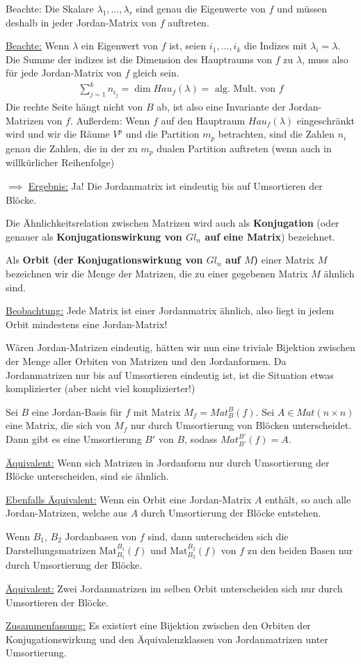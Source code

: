 \documentclass{report}
\newcommand*{\newpar}{\par\vspace{\baselineskip}\noindent}
\newcommand{\tbf}[1]{\textbf{#1}}
\newcommand{\ul}[1]{\underline{#1}}
\newcommand{\Mat}[3]{\text{Mat}^{#1}_{#2}\left(#3\right)}
\begin{document}
Beachte: Die Skalare $\lambda_1, \hdots, \lambda_r$ sind genau die Eigenwerte von $f$ und müssen deshalb in jeder Jordan-Matrix von $f$ auftreten.
\newpar
\underline{Beachte:} Wenn $\lambda$ ein Eigenwert von $f$ ist, seien $i_1, \hdots, i_k$ die Indizes mit $\lambda_i = \lambda$. Die Summe der indizes ist die Dimension des Hauptraums von $f$ zu $\lambda$, muss also für jede Jordan-Matrix von $f$ gleich sein.
\begin{align*}
 \sum_{j=1}^k n_{i_j} = \dim Hau_f (\lambda) = \text{ alg. Mult. von $f$}
\end{align*}
Die rechte Seite hängt nicht von $B$ ab, ist also eine Invariante der Jordan-Matrizen von $f$. Außerdem: Wenn $f$ auf den Hauptraum $Hau_f(\lambda)$ eingeschränkt wird und wir die Räume $V^p$ und die Partition $m_p$ betrachten, sind die Zahlen $n_{i}$ genau die Zahlen, die in der zu $m_p$ dualen Partition auftreten (wenn auch in willkürlicher Reihenfolge)
\newpar
$\implies$ \ul{Ergebnis:} Ja! Die Jordanmatrix ist eindeutig bis auf Umsortieren der Blöcke.
\newpar
\begin{definition}
 Die Ähnlichkeitsrelation zwischen Matrizen wird auch als \tbf{Konjugation} (oder genauer als \tbf{Konjugationswirkung von $Gl_n$ auf eine Matrix}) bezeichnet.
\end{definition}
\begin{definition}
 Als \tbf{Orbit (der Konjugationswirkung von $Gl_n$ auf $M$)} einer Matrix $M$ bezeichnen wir die Menge der Matrizen, die zu einer gegebenen Matrix $M$ ähnlich sind.
\end{definition}
\newpar
\ul{Beobachtung:} Jede Matrix ist einer Jordanmatrix ähnlich, also liegt in jedem Orbit mindestens eine Jordan-Matrix!
\newpar
Wären Jordan-Matrizen eindeutig, hätten wir nun eine triviale Bijektion zwischen der Menge aller Orbiten von Matrizen und den Jordanformen. Da Jordanmatrizen nur bis auf Umsortieren eindeutig ist, ist die Situation etwas komplizierter (aber nicht viel komplizierter!)
\newpar
\begin{theorem}
 Sei $B$ eine Jordan-Basis für $f$ mit Matrix $M_f = Mat_B^B (f)$. Sei $A \in Mat(n \times n)$ eine Matrix, die sich von $M_f$ nur durch Umsortierung von Blöcken unterscheidet. Dann gibt es eine Umsortierung $B'$ von $B$, sodass $Mat_{B'}^{B'} (f) = A$.
\end{theorem}
\newpar
 \ul{Äquivalent:} Wenn sich Matrizen in Jordanform nur durch Umsortierung der Blöcke unterscheiden, sind sie ähnlich.
\newpar
 \ul{Ebenfalls Äquivalent:} Wenn ein Orbit eine Jordan-Matrix $A$ enthält, so auch alle Jordan-Matrizen, welche aus $A$ durch Umsortierung der Blöcke entstehen.
\newpar
\begin{theorem}
 Wenn $B_1$, $B_2$ Jordanbasen von $f$ sind, dann unterscheiden sich die Darstellungsmatrizen $\Mat{B_1}{B_1}{f}$ und $\Mat{B_2}{B_2}{f}$ von $f$ zu den beiden Basen nur durch Umsortierung der Blöcke.
\end{theorem}
\newpar
\ul{Äquivalent:} Zwei Jordanmatrizen im selben Orbit unterscheiden sich nur durch Umsortieren der Blöcke.
\newpar
\ul{Zusammenfassung:} Es existiert eine Bijektion zwischen den Orbiten der Konjugationswirkung und den Äquivalenzklassen von Jordanmatrizen unter Umsortierung.
\end{document}

